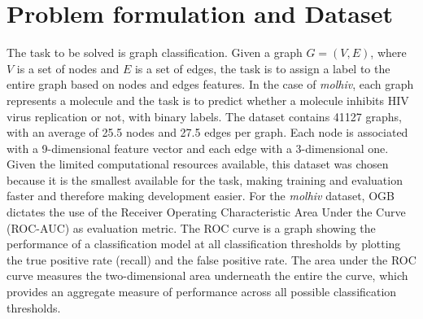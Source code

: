 \documentclass[journal]{IEEEtran}
\begin{document}
\section{Problem formulation and Dataset}
\label{sec:prob-data}
The task to be solved is graph classification.
Given a graph $G=(V,E)$, where $V$ is a set of nodes and $E$ is a set of edges, the task is to assign a label to the entire graph based on nodes and edges features.
In the case of \textit{molhiv}, each graph represents a molecule and the task is to predict whether a molecule inhibits HIV virus replication or not, with binary labels.
The dataset contains 41127 graphs, with an average of 25.5 nodes and 27.5 edges per graph.
Each node is associated with a 9-dimensional feature vector and each edge with a 3-dimensional one.
Given the limited computational resources available, this dataset was chosen because it is the smallest available for the task, making training and evaluation faster and therefore making development easier.
For the \textit{molhiv} dataset, OGB dictates the use of the Receiver Operating Characteristic Area Under the Curve (ROC-AUC) as evaluation metric.
The ROC curve is a graph showing the performance of a classification model at all classification thresholds by plotting the true positive rate (recall) and the false positive rate.
The area under the ROC curve measures the two-dimensional area underneath the entire the curve, which provides an aggregate measure of performance across all possible classification thresholds.
\end{document}

